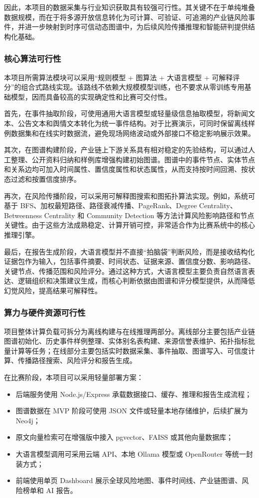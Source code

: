 ﻿\documentclass[12pt,a4paper]{article}
\begin{document}
因此，本项目的数据采集与行业知识获取具有较强可行性。其关键不在于单纯堆叠数据规模，而在于将多源开放信息转化为可计算、可验证、可追溯的产业链风险事件，并进一步映射到时序可信动态图谱中，为后续风险传播推理和智能研判提供结构化基础。

\subsubsection{核心算法可行性}

本项目所需算法模块可以采用“规则模型 + 图算法 + 大语言模型 + 可解释评分”的组合式路线实现。该路线不依赖大规模模型训练，也不要求从零训练专用基础模型，因而具备较高的实现确定性和比赛可交付性。

首先，在事件抽取阶段，可使用通用大语言模型或轻量级信息抽取模型，将新闻文本、公告文本和舆情文本转化为统一事件结构。对于比赛演示，可同时保留离线样例数据集和在线实时数据流，避免现场网络波动或外部接口不稳定影响展示效果。

其次，在图谱构建阶段，产业链上下游关系具有相对稳定的先验结构，可以通过人工整理、公开资料归纳和样例库增强构建初始图谱。图谱中的事件节点、实体节点和关系边均可加入时间属性、置信度属性和状态属性，从而支持按时间回溯、按状态过滤和按置信度排序。

再次，在风险传播阶段，可以采用可解释图搜索和图拓扑算法实现。例如，系统可基于 BFS、加权最短路径、路径衰减传播、PageRank、Degree Centrality、Betweenness Centrality 和 Community Detection 等方法计算风险影响路径和节点关键性。由于这些方法成熟稳定、计算开销可控，非常适合作为比赛系统中的核心推理引擎。

最后，在报告生成阶段，大语言模型并不直接“拍脑袋”判断风险，而是接收结构化证据包作为输入，包括事件摘要、时间状态、证据来源、置信度分数、影响路径、关键节点、传播范围和风险评分。通过这种方式，大语言模型主要负责自然语言表达、逻辑组织和决策建议生成，而核心判断依据由图谱和评分模型提供，从而降低幻觉风险，提高结果可解释性。

\subsubsection{算力与硬件资源可行性}

项目整体计算负载可拆分为离线构建与在线推理两部分。离线部分主要包括产业链图谱初始化、历史事件样例整理、实体别名表构建、来源信誉表维护、拓扑指标批量计算等任务；在线部分主要包括实时数据采集、事件抽取、图谱写入、可信度计算、传播路径搜索、风险评分和报告生成。

在比赛阶段，本项目可以采用轻量部署方案：
\begin{itemize}
    \item 后端服务使用 Node.js/Express 承载数据接口、缓存、推理和报告生成流程；
    \item 图谱数据在 MVP 阶段可使用 JSON 文件或轻量本地存储维护，后续扩展为 Neo4j；
    \item 原文向量检索可在增强版中接入 pgvector、FAISS 或其他向量数据库；
    \item 大语言模型调用可采用云端 API、本地 Ollama 模型或 OpenRouter 等统一封装方式；
    \item 前端使用单页 Dashboard 展示全球风险地图、事件时间线、产业链图谱、风险榜单和 AI 报告。
\end{itemize}
\end{document}
